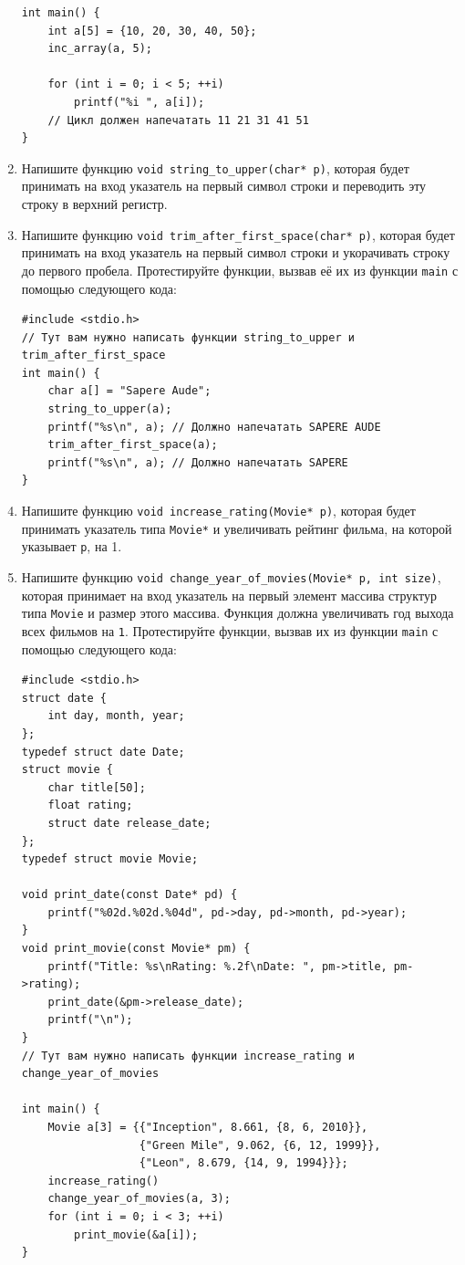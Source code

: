 \documentclass{article}
\begin{document}
\begin{enumerate}
\begin{lstlisting}
int main() {
    int a[5] = {10, 20, 30, 40, 50};
    inc_array(a, 5); 
    
    for (int i = 0; i < 5; ++i)
        printf("%i ", a[i]); 
    // Цикл должен напечатать 11 21 31 41 51
}
\end{lstlisting}
\item Напишите функцию \texttt{void string\_to\_upper(char* p)}, которая будет принимать на вход указатель на первый символ строки и переводить эту строку в верхний регистр.

\item Напишите функцию \texttt{void trim\_after\_first\_space(char* p)}, которая будет принимать на вход указатель на первый символ строки и укорачивать строку до первого пробела. Протестируйте функции, вызвав её их из функции \texttt{main} с помощью следующего кода:
\begin{lstlisting}
#include <stdio.h>
// Тут вам нужно написать функции string_to_upper и trim_after_first_space
int main() {
    char a[] = "Sapere Aude";
    string_to_upper(a);
    printf("%s\n", a); // Должно напечатать SAPERE AUDE
    trim_after_first_space(a);
    printf("%s\n", a); // Должно напечатать SAPERE
}
\end{lstlisting}

\item Напишите функцию \texttt{void increase\_rating(Movie* p)}, которая будет принимать указатель типа \texttt{Movie*} и увеличивать рейтинг фильма, на которой указывает \texttt{p}, на 1.

\item Напишите функцию \texttt{void change\_year\_of\_movies(Movie* p, int size)}, которая принимает на вход указатель на первый элемент массива структур типа \texttt{Movie} и размер этого массива. Функция должна увеличивать год выхода всех фильмов на \texttt{1}. Протестируйте функции, вызвав их из функции \texttt{main} с помощью следующего кода:

\begin{lstlisting}
#include <stdio.h>
struct date {
    int day, month, year;
};
typedef struct date Date;
struct movie {
    char title[50];
    float rating;
    struct date release_date;
};
typedef struct movie Movie;

void print_date(const Date* pd) {
    printf("%02d.%02d.%04d", pd->day, pd->month, pd->year);
}
void print_movie(const Movie* pm) {
    printf("Title: %s\nRating: %.2f\nDate: ", pm->title, pm->rating);
    print_date(&pm->release_date);
    printf("\n");
}
// Тут вам нужно написать функции increase_rating и change_year_of_movies

int main() {
    Movie a[3] = {{"Inception", 8.661, {8, 6, 2010}}, 
                  {"Green Mile", 9.062, {6, 12, 1999}}, 
                  {"Leon", 8.679, {14, 9, 1994}}};
    increase_rating()
    change_year_of_movies(a, 3);
    for (int i = 0; i < 3; ++i)
        print_movie(&a[i]);
}
\end{lstlisting}

\end{enumerate}
\end{document}
